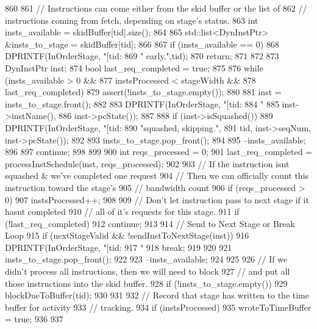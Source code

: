 \begin{DoxyCode}
860 {
861     // Instructions can come either from the skid buffer or the list of
862     // instructions coming from fetch, depending on stage's status.
863     int insts_available = skidBuffer[tid].size();
864 
865     std::list<DynInstPtr> &insts_to_stage = skidBuffer[tid];
866 
867     if (insts_available == 0) {
868         DPRINTF(InOrderStage, "[tid:%
869                 " early.\n",tid);
870         return;
871     }
872 
873     DynInstPtr inst;
874     bool last_req_completed = true;
875 
876     while (insts_available > 0 &&
877            instsProcessed < stageWidth &&
878            last_req_completed) {
879         assert(!insts_to_stage.empty());
880 
881         inst = insts_to_stage.front();
882 
883         DPRINTF(InOrderStage, "[tid:%
884                 "%
885                 inst->instName(),
886                 inst->pcState());
887 
888         if (inst->isSquashed()) {
889             DPRINTF(InOrderStage, "[tid:%
890                     "squashed, skipping.\n",
891                     tid, inst->seqNum, inst->pcState());
892 
893             insts_to_stage.pop_front();
894 
895             --insts_available;
896 
897             continue;
898         }
899 
900         int reqs_processed = 0;        
901         last_req_completed = processInstSchedule(inst, reqs_processed);
902 
903         // If the instruction isnt squashed & we've completed one request
904         // Then we can officially count this instruction toward the stage's 
905         // bandwidth count
906         if (reqs_processed > 0)
907             instsProcessed++;
908 
909         // Don't let instruction pass to next stage if it hasnt completed
910         // all of it's requests for this stage.
911         if (!last_req_completed)
912             continue;
913 
914         // Send to Next Stage or Break Loop
915         if (nextStageValid && !sendInstToNextStage(inst)) {
916             DPRINTF(InOrderStage, "[tid:%
917                     " %
918             break;
919         }
920 
921         insts_to_stage.pop_front();
922 
923         --insts_available;
924     }
925 
926     // If we didn't process all instructions, then we will need to block
927     // and put all those instructions into the skid buffer.
928     if (!insts_to_stage.empty()) {
929         blockDueToBuffer(tid);
930     }
931 
932     // Record that stage has written to the time buffer for activity
933     // tracking.
934     if (instsProcessed) {
935         wroteToTimeBuffer = true;
936     }
937 }
\end{DoxyCode}
